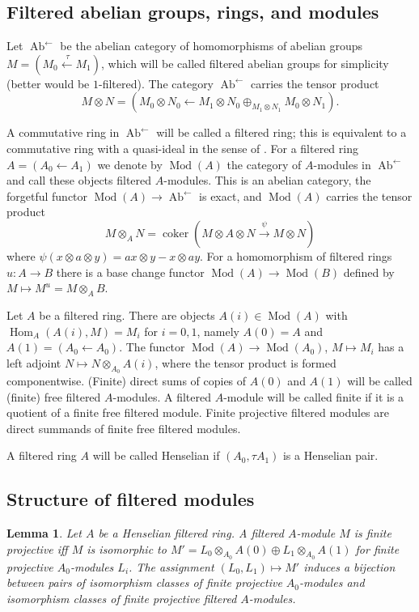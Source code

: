\documentclass[a4paper,11pt]{amsart}
\theoremstyle{plain}
\newtheorem{Lemma}[equation]{Lemma}
\theoremstyle{definition}
\theoremstyle{remark}
\newcommand{\bLe}{\begin{Lemma}}
\newcommand{\eLe}{\end{Lemma}}
\numberwithin{equation}{section}
\DeclareMathOperator{\coker}{coker}
\DeclareMathOperator{\Ab}{Ab}
\DeclareMathOperator{\Hom}{Hom}
\DeclareMathOperator{\Mod}{Mod}
\begin{document}
\subsection{Filtered abelian groups, rings, and modules}

Let $\Ab^{\leftarrow}$ be the abelian category of homomorphisms of abelian groups $M=(M_0\xleftarrow{\:\tau} M_1)$, which will be called filtered abelian groups for simplicity (better would be $1$-filtered). The category $\Ab^{\leftarrow}$ carries the tensor product
\[
M\otimes N=(M_0\otimes N_0\leftarrow M_1\otimes N_0\oplus_{M_1\otimes N_1}M_0\otimes N_1).
\]

A commutative ring in $\Ab^{\leftarrow}$ will be called a filtered ring; this is equivalent to a commutative ring with a quasi-ideal in the sense of \cite{Drinfeld:Ring-groupoid}.
For a filtered ring $A=(A_0\leftarrow A_1)$ we denote by $\Mod(A)$ the category of $A$-modules in $\Ab^{\leftarrow}$ and call these objects filtered $A$-modules. 
This is an abelian category, the forgetful functor $\Mod(A)\to\Ab^\leftarrow$ is exact, and $\Mod(A)$ carries the tensor product
\[
M\otimes_AN=\coker(M\otimes A\otimes N\xrightarrow\psi M\otimes N)
\]
where $\psi(x\otimes a\otimes y)=ax\otimes y-x\otimes ay$.
For a homomorphism of filtered rings $u\colon A\to B$ there is a base change functor $\Mod(A)\to\Mod(B)$ defined by $M\mapsto M^u=M\otimes_AB$. 

Let $A$ be a filtered ring.
There are objects $A(i)\in\Mod(A)$ with $\Hom_A(A(i),M)=M_i$ for $i=0,1$, namely $A(0)=A$ and $A(1)=(A_0\leftarrow A_0)$. 
The functor $\Mod(A)\to\Mod(A_0)$, $M\mapsto M_i$ has a left adjoint $N\mapsto N\otimes_{A_0}A(i)$, where the tensor product is formed componentwise.
(Finite) direct sums of copies of $A(0)$ and $A(1)$ will be called (finite) free filtered $A$-modules. A filtered $A$-module will be called finite if it is a quotient of a finite free filtered module. 
Finite projective filtered modules are direct summands of  finite free filtered modules. 

A filtered ring $A$ will be called Henselian if $(A_0,\tau A_1)$ is a Henselian pair.

\subsection{Structure of filtered modules}

\bLe
\label{Le:fil-proj-mod}
Let $A$ be a Henselian filtered ring. A filtered $A$-module $M$ is finite projective iff $M$ is isomorphic to $M'=L_0\otimes_{A_0}A(0)\oplus L_1\otimes_{A_0}A(1)$ for finite projective $A_0$-modules $L_i$. The assignment $(L_0,L_1)\mapsto M'$ induces a bijection between pairs of isomorphism classes of finite projective $A_0$-modules and isomorphism classes of finite projective filtered $A$-modules.
\eLe
\end{document}

